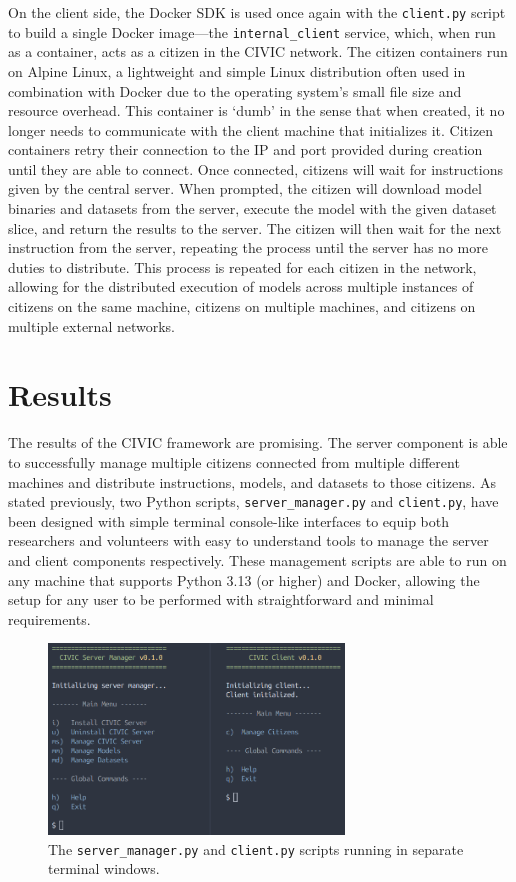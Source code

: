 \documentclass[11pt]{article}
\begin{document}
On the client side, the Docker SDK is used once again with the \verb|client.py| script to build a single Docker image---the \verb|internal_client| service, which, when run as a container, acts as a citizen in the CIVIC network. The citizen containers run on Alpine Linux, a lightweight and simple Linux distribution often used in combination with Docker due to the operating system's small file size and resource overhead. This container is `dumb' in the sense that when created, it no longer needs to communicate with the client machine that initializes it. Citizen containers retry their connection to the IP and port provided during creation until they are able to connect. Once connected, citizens will wait for instructions given by the central server. When prompted, the citizen will download model binaries and datasets from the server, execute the model with the given dataset slice, and return the results to the server. The citizen will then wait for the next instruction from the server, repeating the process until the server has no more duties to distribute. This process is repeated for each citizen in the network, allowing for the distributed execution of models across multiple instances of citizens on the same machine, citizens on multiple machines, and citizens on multiple external networks. 

\section{Results}

The results of the CIVIC framework are promising. The server component is able to successfully manage multiple citizens connected from multiple different machines and distribute instructions, models, and datasets to those citizens. As stated previously, two Python scripts, \verb|server_manager.py| and \verb|client.py|, have been designed with simple terminal console-like interfaces to equip both researchers and volunteers with easy to understand tools to manage the server and client components respectively. These management scripts are able to run on any machine that supports Python 3.13 (or higher) and Docker, allowing the setup for any user to be performed with straightforward and minimal requirements.

\begin{figure}[h]
    \centering
    \includegraphics[width=0.7\textwidth]{./figures/terminals.png}
    \caption{\small The \texttt{server\_manager.py} and \texttt{client.py} scripts running in separate terminal windows.}\label{fig:terminals}
\end{figure}
\end{document}
